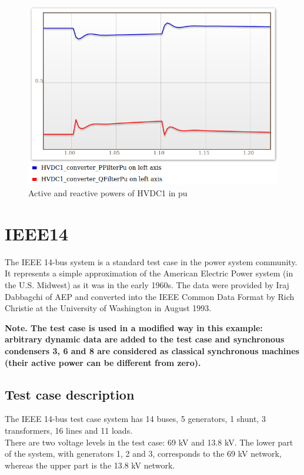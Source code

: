 \documentclass[a4paper, 12pt]{report}
\begin{document}
\begin{figure}[H]
  \includegraphics[width=\textwidth]{PQHVDC1.png}
  \caption{Active and reactive powers of HVDC1 in pu}
\end{figure}

\chapter{IEEE14}

The IEEE 14-bus system is a standard test case in the power system community. It represents a simple approximation of the American Electric Power system (in the U.S. Midwest) as it was in the early 1960s. The data were provided by Iraj Dabbagchi of AEP and converted into the IEEE Common Data Format by Rich Christie at the University of Washington in August 1993.

\textbf{Note. The test case is used in a modified way in this example: arbitrary dynamic data are added to the test case and synchronous condensers 3, 6 and 8 are considered as classical synchronous machines (their active power can be different from zero).}

\section{Test case description}

The IEEE 14-bus test case system has 14 buses, 5 generators, 1 shunt, 3 transformers, 16 lines and 11 loads.\\
There are two voltage levels in the test case: 69 kV and 13.8 kV. The lower part of the system, with generators 1, 2 and 3, corresponds to the 69 kV network, whereas the upper part is the 13.8 kV network.
\end{document}
